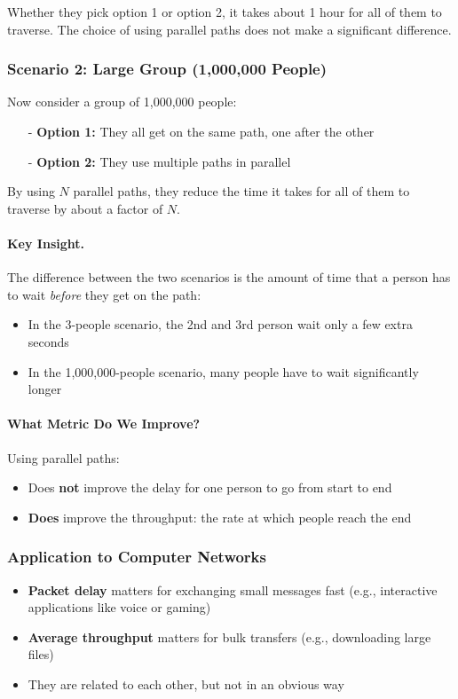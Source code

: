 \documentclass[../../compsys.tex]{subfiles}
\begin{document}
Whether they pick option 1 or option 2, it takes about 1 hour for all of them to traverse. The choice of using parallel paths does not make a significant difference.

\subsubsection{Scenario 2: Large Group (1,000,000 People)}
Now consider a group of 1,000,000 people:
\begin{itemize}
  \item[-] \textbf{Option 1:} They all get on the same path, one after the other
  \item[-] \textbf{Option 2:} They use multiple paths in parallel
\end{itemize}

By using \(N\) parallel paths, they reduce the time it takes for all of them to traverse by about a factor of \(N\).

\paragraph{Key Insight.} The difference between the two scenarios is the amount of time that a person has to wait \emph{before} they get on the path:
\begin{itemize}
  \item In the 3-people scenario, the 2nd and 3rd person wait only a few extra seconds
  \item In the 1,000,000-people scenario, many people have to wait significantly longer
\end{itemize}

\paragraph{What Metric Do We Improve?}
Using parallel paths:
\begin{itemize}
  \item Does \textbf{not} improve the delay for one person to go from start to end
  \item \textbf{Does} improve the throughput: the rate at which people reach the end
\end{itemize}

\subsubsection{Application to Computer Networks}
\begin{itemize}
  \item \textbf{Packet delay} matters for exchanging small messages fast (e.g., interactive applications like voice or gaming)
  \item \textbf{Average throughput} matters for bulk transfers (e.g., downloading large files)
  \item They are related to each other, but not in an obvious way
\end{itemize}
\end{document}
